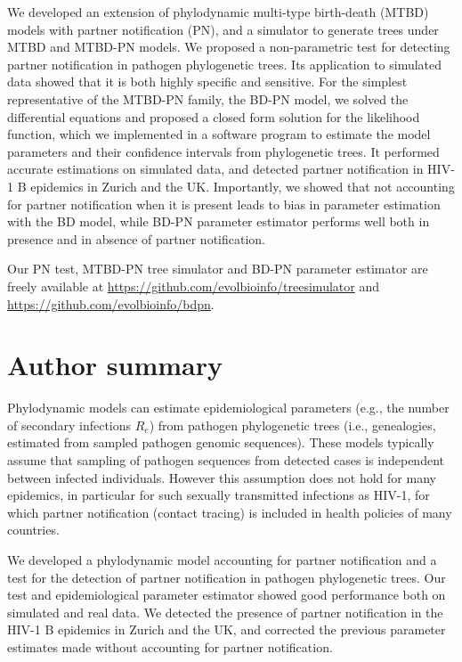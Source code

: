 \documentclass[10pt,letterpaper]{article}
\begin{document}
We developed an extension of phylodynamic multi-type birth-death (MTBD) models with partner notification (PN), and a simulator to generate trees under MTBD and MTBD-PN models. We proposed a non-parametric test for detecting partner notification in pathogen phylogenetic trees. Its application to simulated data showed that it is both highly specific and sensitive. For the simplest representative of the MTBD-PN family, the BD-PN model, we solved the differential equations and proposed a closed form solution for the likelihood function, which we implemented in a software program to estimate the model parameters and their confidence intervals from phylogenetic trees. It performed accurate estimations on simulated data, and detected partner notification in HIV-1 B epidemics in Zurich and the UK. Importantly, we showed that not accounting for partner notification when it is present leads to bias in parameter estimation with the BD model, while BD-PN parameter estimator performs well both in presence and in absence of partner notification.

Our PN test, MTBD-PN tree simulator and BD-PN parameter estimator are freely available at \href{github.com/evolbioinfo/treesimulator}{https://github.com/evolbioinfo/treesimulator} and \href{github.com/evolbioinfo/bdpn}{https://github.com/evolbioinfo/bdpn}.


\section*{Author summary}
Phylodynamic models can estimate epidemiological parameters (e.g., the number of secondary infections $R_e$) from pathogen phylogenetic trees (i.e., genealogies, estimated from sampled pathogen genomic sequences). These models typically assume that sampling of pathogen sequences from detected cases is independent between infected individuals. However this assumption does not hold for many epidemics, in particular for such sexually transmitted infections as HIV-1, for which partner notification (contact tracing) is included in health policies of many countries. 

We developed a phylodynamic model accounting for partner notification and a test for the detection of partner notification in pathogen phylogenetic trees. Our test and epidemiological parameter estimator showed good performance both on simulated and real data. We detected the presence of partner notification in the HIV-1 B epidemics in Zurich and the UK, and corrected the previous parameter estimates made without accounting for partner notification. %
\end{document}
